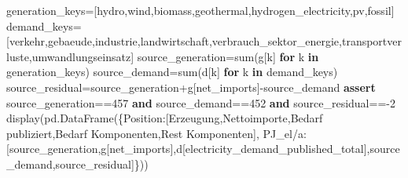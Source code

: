 \documentclass[
  ngerman,
  a4paper,
  DIV=11]{scrreprt}
\newenvironment{Shaded}{\begin{snugshade}}{\end{snugshade}}
\newcommand{\BuiltInTok}[1]{\textcolor[rgb]{0.00,0.23,0.31}{#1}}
\newcommand{\ControlFlowTok}[1]{\textcolor[rgb]{0.00,0.23,0.31}{\textbf{#1}}}
\newcommand{\DecValTok}[1]{\textcolor[rgb]{0.68,0.00,0.00}{#1}}
\newcommand{\KeywordTok}[1]{\textcolor[rgb]{0.00,0.23,0.31}{\textbf{#1}}}
\newcommand{\NormalTok}[1]{\textcolor[rgb]{0.00,0.23,0.31}{#1}}
\newcommand{\OperatorTok}[1]{\textcolor[rgb]{0.37,0.37,0.37}{#1}}
\newcommand{\StringTok}[1]{\textcolor[rgb]{0.13,0.47,0.30}{#1}}
\begin{document}
\begin{Shaded}
\begin{Highlighting}[]
\NormalTok{generation\_keys}\OperatorTok{=}\NormalTok{[}\StringTok{\textquotesingle{}hydro\textquotesingle{}}\NormalTok{,}\StringTok{\textquotesingle{}wind\textquotesingle{}}\NormalTok{,}\StringTok{\textquotesingle{}biomass\textquotesingle{}}\NormalTok{,}\StringTok{\textquotesingle{}geothermal\textquotesingle{}}\NormalTok{,}\StringTok{\textquotesingle{}hydrogen\_electricity\textquotesingle{}}\NormalTok{,}\StringTok{\textquotesingle{}pv\textquotesingle{}}\NormalTok{,}\StringTok{\textquotesingle{}fossil\textquotesingle{}}\NormalTok{]}
\NormalTok{demand\_keys}\OperatorTok{=}\NormalTok{[}\StringTok{\textquotesingle{}verkehr\textquotesingle{}}\NormalTok{,}\StringTok{\textquotesingle{}gebaeude\textquotesingle{}}\NormalTok{,}\StringTok{\textquotesingle{}industrie\textquotesingle{}}\NormalTok{,}\StringTok{\textquotesingle{}landwirtschaft\textquotesingle{}}\NormalTok{,}\StringTok{\textquotesingle{}verbrauch\_sektor\_energie\textquotesingle{}}\NormalTok{,}\StringTok{\textquotesingle{}transportverluste\textquotesingle{}}\NormalTok{,}\StringTok{\textquotesingle{}umwandlungseinsatz\textquotesingle{}}\NormalTok{]}
\NormalTok{source\_generation}\OperatorTok{=}\BuiltInTok{sum}\NormalTok{(g[k] }\ControlFlowTok{for}\NormalTok{ k }\KeywordTok{in}\NormalTok{ generation\_keys)}
\NormalTok{source\_demand}\OperatorTok{=}\BuiltInTok{sum}\NormalTok{(d[k] }\ControlFlowTok{for}\NormalTok{ k }\KeywordTok{in}\NormalTok{ demand\_keys)}
\NormalTok{source\_residual}\OperatorTok{=}\NormalTok{source\_generation}\OperatorTok{+}\NormalTok{g[}\StringTok{\textquotesingle{}net\_imports\textquotesingle{}}\NormalTok{]}\OperatorTok{{-}}\NormalTok{source\_demand}
\ControlFlowTok{assert}\NormalTok{ source\_generation}\OperatorTok{==}\DecValTok{457} \KeywordTok{and}\NormalTok{ source\_demand}\OperatorTok{==}\DecValTok{452} \KeywordTok{and}\NormalTok{ source\_residual}\OperatorTok{=={-}}\DecValTok{2}
\NormalTok{display(pd.DataFrame(\{}\StringTok{\textquotesingle{}Position\textquotesingle{}}\NormalTok{:[}\StringTok{\textquotesingle{}Erzeugung\textquotesingle{}}\NormalTok{,}\StringTok{\textquotesingle{}Nettoimporte\textquotesingle{}}\NormalTok{,}\StringTok{\textquotesingle{}Bedarf publiziert\textquotesingle{}}\NormalTok{,}\StringTok{\textquotesingle{}Bedarf Komponenten\textquotesingle{}}\NormalTok{,}\StringTok{\textquotesingle{}Rest Komponenten\textquotesingle{}}\NormalTok{],}
                      \StringTok{\textquotesingle{}PJ\_el/a\textquotesingle{}}\NormalTok{:[source\_generation,g[}\StringTok{\textquotesingle{}net\_imports\textquotesingle{}}\NormalTok{],d[}\StringTok{\textquotesingle{}electricity\_demand\_published\_total\textquotesingle{}}\NormalTok{],source\_demand,source\_residual]\}))}
\end{Highlighting}
\end{Shaded}
\end{document}
